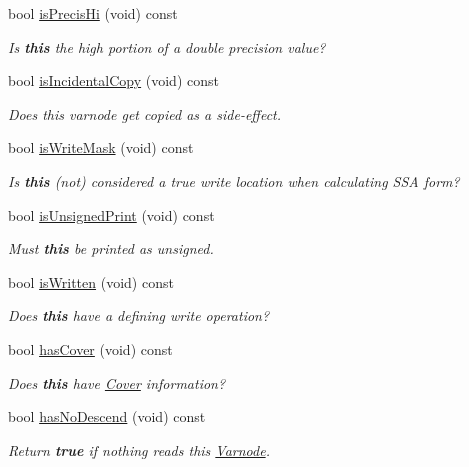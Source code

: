 \begin{DoxyCompactItemize}
bool \mbox{\hyperlink{class_varnode_a606fd6d28785209dc68f35d416bbacab}{is\+Precis\+Hi}} (void) const
\begin{DoxyCompactList}\small\item\em Is {\bfseries{this}} the high portion of a double precision value? \end{DoxyCompactList}\item 
bool \mbox{\hyperlink{class_varnode_a512b300f3dc01c9bdb03242c05c8a932}{is\+Incidental\+Copy}} (void) const
\begin{DoxyCompactList}\small\item\em Does this varnode get copied as a side-\/effect. \end{DoxyCompactList}\item 
bool \mbox{\hyperlink{class_varnode_abc9895d5099784197952078f8be69a14}{is\+Write\+Mask}} (void) const
\begin{DoxyCompactList}\small\item\em Is {\bfseries{this}} (not) considered a true write location when calculating S\+SA form? \end{DoxyCompactList}\item 
bool \mbox{\hyperlink{class_varnode_a80776efcc750bb3945fb2b3fa7ffa346}{is\+Unsigned\+Print}} (void) const
\begin{DoxyCompactList}\small\item\em Must {\bfseries{this}} be printed as unsigned. \end{DoxyCompactList}\item 
bool \mbox{\hyperlink{class_varnode_a6bb7eafb49a6ddea2bac8f4ab5aed6e9}{is\+Written}} (void) const
\begin{DoxyCompactList}\small\item\em Does {\bfseries{this}} have a defining write operation? \end{DoxyCompactList}\item 
bool \mbox{\hyperlink{class_varnode_a907053b388958d0f381226828ac4d47e}{has\+Cover}} (void) const
\begin{DoxyCompactList}\small\item\em Does {\bfseries{this}} have \mbox{\hyperlink{class_cover}{Cover}} information? \end{DoxyCompactList}\item 
bool \mbox{\hyperlink{class_varnode_a31e0233982910746322b8040fe3341e0}{has\+No\+Descend}} (void) const
\begin{DoxyCompactList}\small\item\em Return {\bfseries{true}} if nothing reads this \mbox{\hyperlink{class_varnode}{Varnode}}. \end{DoxyCompactList}\item 

\end{DoxyCompactItemize}
